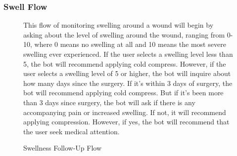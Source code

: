 \documentclass[12pt,oneside,openright,a4paper]{cpe-english-project}
\begin{document}
        \subsubsection{Swell Flow}
          \begin{figure}[!h]
            \centering
            \caption{Swellness Follow-Up Flow}\label{fig:FollowUpFlow4}
            \begin{flushleft}
              \qquad This flow of monitoring swelling around a wound will begin by asking about the level of swelling around the wound, ranging from 0-10, where 0 means no swelling at all and 10 means the most severe swelling ever experienced. If the user selects a swelling level less than 5, the bot will recommend applying cold compress. However, if the user selects a swelling level of 5 or higher, the bot will inquire about how many days since the surgery. If it's within 3 days of surgery, the bot will recommend applying cold compress. But if it's been more than 3 days since surgery, the bot will ask if there is any accompanying pain or increased swelling. If not, it will recommend applying compression. However, if yes, the bot will recommend that the user seek medical attention.\par
            \end{flushleft}        
          \end{figure}
\end{document}
